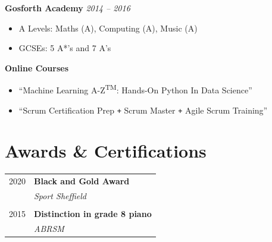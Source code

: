 \documentclass[10pt]{article} %
\begin{document}
\begin{changemargin}{0pt}{0.5pt}
\begin{minipage}[t]{0.44\textwidth}
\begin{changemargin}{5pt}{5pt}
	
	\textbf{Gosforth Academy} \hfill \textit{ 2014 --  2016}
	\vspace{-5pt}
	\begin{itemize} \itemsep-2pt %
		\item A Levels: Maths (A), Computing (A), Music (A)
		\item GCSEs: 5 A*'s and 7 A's
	\end{itemize}
	
\end{changemargin}


\begin{changemargin}{5pt}{5pt}
	
	\textbf{Online Courses}
	\vspace{-5pt}
	\begin{itemize} \itemsep-2pt %
		\item \enquote{Machine Learning A-Z\textsuperscript{TM}: Hands-On Python In Data Science}
		\item \enquote{Scrum Certification Prep \texttt{+} Scrum Master \texttt{+} Agile Scrum Training}
	\end{itemize}
	
\end{changemargin}


\section{Awards \& Certifications}

\begin{tabular}{rl}
	
	2020	 & \textbf{Black and Gold Award}\\ & \textit{Sport Sheffield} \\ \\
	
	
	2015	 & \textbf{Distinction in grade 8 piano}\\ & \textit{ABRSM}
\end{tabular}\\[10pt]


\end{minipage}
\end{changemargin}
\end{document}
